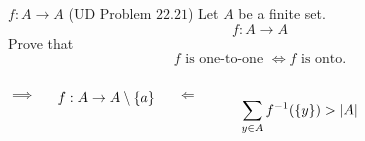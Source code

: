 \begin{frame}{}
  \begin{exampleblock}{$f: A \to A$ (UD Problem $22.21$)}
    Let $A$ be a finite set.
    \[
      f: A \to A
    \]
    Prove that 
    \[
      f \text{ is one-to-one } \iff f \text{ is onto}.
    \]
  \end{exampleblock}

  \pause
  \vspace{0.60cm}
  \begin{columns}
      \[
	\implies
      \]

      \pause
      \begin{center}
	{}

	\pause
	\[
	  f: A \to A \setminus \{a\}
	\]

	{}
      \end{center}
      \pause
      \[
	\Longleftarrow
      \]

      \pause
      \begin{center}
	{}
      \end{center}

      \pause
      \[
	\sum_{y \in A} f^{-1}(\{y\}) > |A|
      \]
  \end{columns}
\end{frame}
